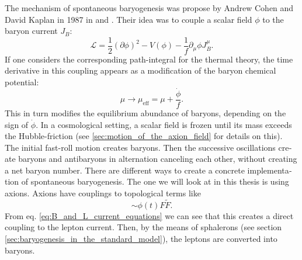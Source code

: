 \documentclass[master,       %
               twoside,        %
               BCOR10mm,       %
               english,ngerman, %
               ]{GAUBM}
\begin{document}
\begin{otherlanguage}{english}
The mechanism of spontaneous baryogenesis was propose by Andrew Cohen and David Kaplan in 1987 in \cite{COHEN1987251} and \cite{COHEN1988913}.
Their idea was to couple a scalar field $\phi$ to the baryon current $J_B$:
\begin{equation}
	\label{eq:simple_sbg}
	\mathcal{L} = \frac{1}{2} (\partial \phi)^2 - V(\phi) - \frac{1}{f} \partial_\mu \phi J_B^\mu.
\end{equation}
If one considers the corresponding path-integral for the thermal theory, the time derivative in this coupling appears as a modification of the baryon chemical potential:
\begin{equation}
	\mu \to \mu_\mathrm{eff} = \mu + \frac{\dot{\phi}}{f}.
\end{equation}
This in turn modifies the equilibrium abundance of baryons, depending on the sign of $\dot{\phi}$.
In a cosmological setting, a scalar field is frozen until its mass exceeds the Hubble-friction (see \ref{sec:motion_of_the_axion_field} for details on this). The initial fast-roll motion creates baryons. Then the successive oscillations create baryons and antibaryons in alternation canceling each other, without creating a net baryon number.
There are different ways to create a concrete implementation of spontaneous baryogenesis.
The one we will look at in this thesis is using axions.
Axions have couplings to topological terms like
\begin{equation}
	 \sim \phi(t) F \tilde{F}.
\end{equation}
From eq. \eqref{eq:B_and_L_current_equations} we can see that this creates a direct coupling to the lepton current.
Then, by the means of sphalerons (see section \ref{sec:baryogenesis_in_the_standard_model}), the leptons are converted into baryons.


\end{otherlanguage}
\end{document}

